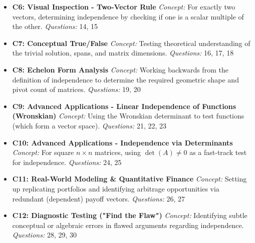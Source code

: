 \documentclass[12pt]{article}
\begin{document}
\begin{itemize}
    \item \textbf{C6: Visual Inspection - Two-Vector Rule}
    \newline \textit{Concept:} For exactly two vectors, determining independence by checking if one is a scalar multiple of the other.
    \newline \textit{Questions:} 14, 15
    
    \item \textbf{C7: Conceptual True/False}
    \newline \textit{Concept:} Testing theoretical understanding of the trivial solution, spans, and matrix dimensions.
    \newline \textit{Questions:} 16, 17, 18
    
    \item \textbf{C8: Echelon Form Analysis}
    \newline \textit{Concept:} Working backwards from the definition of independence to determine the required geometric shape and pivot count of matrices.
    \newline \textit{Questions:} 19, 20
    
    \item \textbf{C9: Advanced Applications - Linear Independence of Functions (Wronskian)}
    \newline \textit{Concept:} Using the Wronskian determinant to test functions (which form a vector space).
    \newline \textit{Questions:} 21, 22, 23
    
    \item \textbf{C10: Advanced Applications - Independence via Determinants}
    \newline \textit{Concept:} For square $n \times n$ matrices, using $\det(A) \neq 0$ as a fast-track test for independence.
    \newline \textit{Questions:} 24, 25
    
    \item \textbf{C11: Real-World Modeling \& Quantitative Finance}
    \newline \textit{Concept:} Setting up replicating portfolios and identifying arbitrage opportunities via redundant (dependent) payoff vectors.
    \newline \textit{Questions:} 26, 27
    
    \item \textbf{C12: Diagnostic Testing ("Find the Flaw")}
    \newline \textit{Concept:} Identifying subtle conceptual or algebraic errors in flawed arguments regarding independence.
    \newline \textit{Questions:} 28, 29, 30
\end{itemize}
\end{document}
